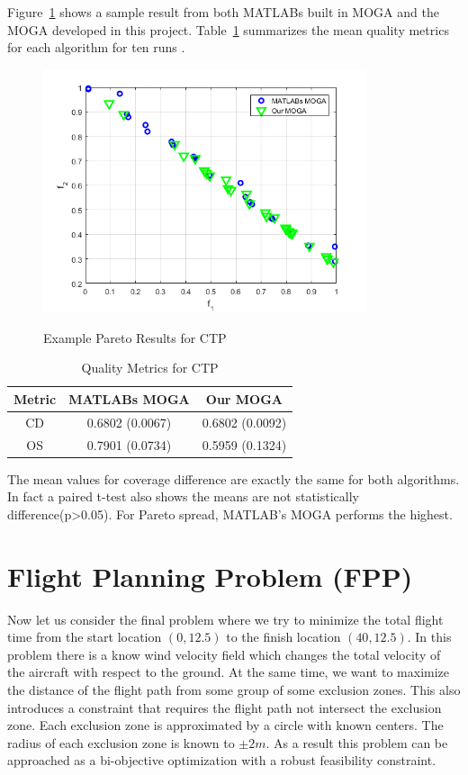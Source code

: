 \documentclass{article}
\begin{document}
Figure~\ref{fig:CTP} shows a sample result from both MATLABs built in MOGA and the MOGA developed in this project. Table~\ref{tab:CTP} summarizes the mean quality metrics for each algorithm for ten runs \cite{deb2001multi}.
\begin{figure}[h]
  \caption{Example Pareto Results for CTP}
  \centering
  \includegraphics[width=0.85\textwidth]{CTP_pareto_final.png}  
  \label{fig:CTP}
\end{figure}

\begin{table}[h]
\caption{Quality Metrics for CTP} 
\centering 
\begin{tabular}{|c|c|c|} 
\hline\hline  
Metric & MATLABs MOGA & Our MOGA \\ \hline
CD & 0.6802 (0.0067) &  0.6802 (0.0092) \\ \hline
OS & 0.7901 (0.0734) & 0.5959 (0.1324) \\ \hline
\end{tabular}
\label{tab:CTP} 
\end{table} 
 
The mean values for coverage difference are exactly the same for both algorithms. In fact a paired t-test also shows the means are not statistically difference(p>0.05). For Pareto spread, MATLAB's MOGA performs the highest.
 
\section{Flight Planning Problem (FPP)}
Now let us consider the final problem where we try to minimize the total flight time from the start location $(0,12.5)$ to the finish location $(40,12.5)$.  In this problem there is a know wind velocity field which changes the total velocity of the aircraft with respect to the ground.  At the same time, we want to maximize the distance of the flight path from some group of some exclusion zones. This also introduces a constraint that requires the flight path not intersect the exclusion zone. Each exclusion zone is approximated by a circle with known centers.  The radius of each exclusion zone is known to $\pm 2m$.  As a result this problem can be approached as a bi-objective optimization with a robust feasibility constraint. 
\end{document}
